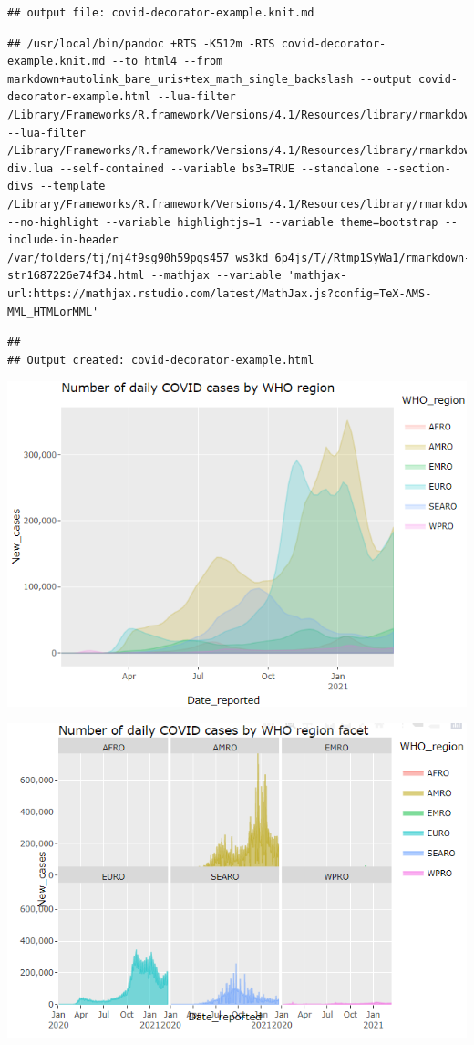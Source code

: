 \documentclass[
]{article}
\begin{document}
\begin{verbatim}
## output file: covid-decorator-example.knit.md
\end{verbatim}

\begin{verbatim}
## /usr/local/bin/pandoc +RTS -K512m -RTS covid-decorator-example.knit.md --to html4 --from markdown+autolink_bare_uris+tex_math_single_backslash --output covid-decorator-example.html --lua-filter /Library/Frameworks/R.framework/Versions/4.1/Resources/library/rmarkdown/rmarkdown/lua/pagebreak.lua --lua-filter /Library/Frameworks/R.framework/Versions/4.1/Resources/library/rmarkdown/rmarkdown/lua/latex-div.lua --self-contained --variable bs3=TRUE --standalone --section-divs --template /Library/Frameworks/R.framework/Versions/4.1/Resources/library/rmarkdown/rmd/h/default.html --no-highlight --variable highlightjs=1 --variable theme=bootstrap --include-in-header /var/folders/tj/nj4f9sg90h59pqs457_ws3kd_6p4js/T//Rtmp1SyWa1/rmarkdown-str1687226e74f34.html --mathjax --variable 'mathjax-url:https://mathjax.rstudio.com/latest/MathJax.js?config=TeX-AMS-MML_HTMLorMML'
\end{verbatim}

\begin{verbatim}
## 
## Output created: covid-decorator-example.html
\end{verbatim}

\includegraphics[width=0.8\linewidth]{latexpics/decoratorexample1}

\includegraphics[width=0.8\linewidth]{latexpics/decoratorexample2}
\end{document}
